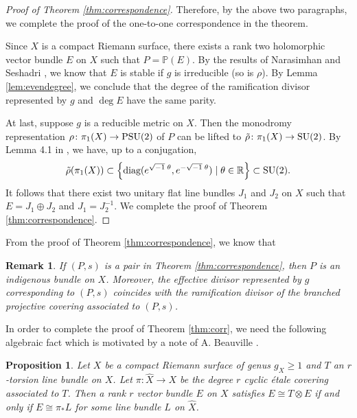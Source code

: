 \documentclass[12pt]{article}
\newtheorem{prop}{Proposition}[section]
\newtheorem{rem}{Remark}[section]
\begin{document}
\begin{proof}[Proof of Theorem \ref{thm:correspondence}]
Therefore, by the above two paragraphs, we complete the proof of the one-to-one correspondence in the theorem.

Since $X$ is a compact Riemann surface, there exists a rank two holomorphic vector bundle $E$ on $X$ such that $P = \mathbb{P}(E)$. By the results of Narasimhan and Seshadri \cite{NS1965}, we know that $E$ is stable if $g$ is irreducible (so is $\rho$). By Lemma \ref{lem:evendegree}, we conclude that the degree of  the ramification divisor represented by $g$ and $\deg E$ have the same parity.

At last, suppose $g$ is a reducible metric on $X$. Then the monodromy representation $\rho \colon \pi_1(X) \rightarrow {\rm PSU(2)}$ of $P$ can be lifted to $\tilde{\rho}\colon \pi_1(X) \rightarrow {\rm SU}(2)$. By Lemma 4.1 in \cite{CWWX2015}, we have,  up to a conjugation,
\[ \tilde{\rho}(\pi_1(X)) \subset \left\{\text{diag}(e^{\sqrt{-1} \; \theta}, e^{ -\sqrt{-1} \; \theta}) \mid \theta \in \mathbb{R}\right\} \subset {\rm SU(2)}. \]
It follows that there exist two unitary flat line bundles $J_1$ and $J_2$ on $X$ such that $E = J_1 \oplus J_2$ and $J_1 = J_2^{-1}$. We  complete the proof of Theorem \ref{thm:correspondence}.
\end{proof}
From the proof of Theorem \ref{thm:correspondence}, we know that
\begin{rem}
\label{rem:divisorequ}
If $(P, s)$ is a pair in Theorem \ref{thm:correspondence}, then $P$ is an indigenous bundle on $X$. Moreover, the effective divisor represented by $g$ corresponding to $(P, s)$ coincides with the ramification divisor of the branched projective covering associated to $(P, s)$.
\end{rem}
In order to complete the proof of Theorem \ref{thm:corr}, we need the following algebraic fact which is motivated by a note of A. Beauville \cite{Beau2000}.
\begin{prop}
\label{prop:directimage}
Let $X$ be a compact Riemann surface of genus $g_X\geq 1$ and $T$ an $r$-torsion line bundle on $X$. Let $\pi \colon \widehat{X} \to X$ be the degree $r$ cyclic \'etale covering associated to $T$. Then a rank $r$ vector bundle $E$ on $X$ satisfies $E \cong T \otimes E $ if and only if $E\cong \pi_{*}L$ for some line bundle $L$ on $\widehat{X}$.
\end{prop}
\end{document}
